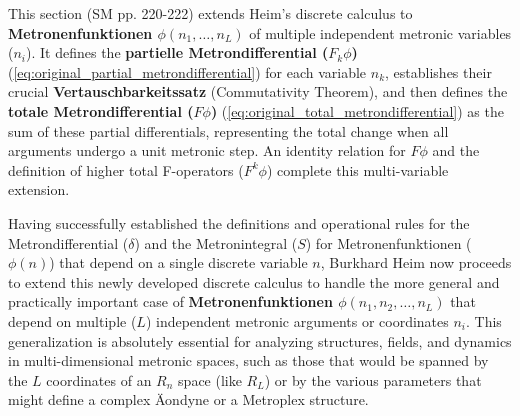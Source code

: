 \documentclass[12pt]{article}
\newcommand{\semantischermetrophor}{R_n}
\newcommand{\metrondifferential}{\delta}
\newcommand{\metronintegral}{S}
\newcommand{\metronenfunktion}{\phi(n)}
\newcommand{\metronenziffer}{n}
\begin{document}
This section (SM pp. 220-222) extends Heim's discrete calculus to \textbf{Metronenfunktionen \( \phi(n_1, \dots, n_L) \)} of multiple independent metronic variables (\(n_i\)). It defines the \textbf{partielle Metrondifferential (\(F_k\phi\))} (\eqref{eq:original_partial_metrondifferential}) for each variable \(n_k\), establishes their crucial \textbf{Vertauschbarkeitssatz} (Commutativity Theorem), and then defines the \textbf{totale Metrondifferential (\(F\phi\))} (\eqref{eq:original_total_metrondifferential}) as the sum of these partial differentials, representing the total change when all arguments undergo a unit metronic step. An identity relation for \(F\phi\) and the definition of higher total F-operators (\(F^k\phi\)) complete this multi-variable extension.

Having successfully established the definitions and operational rules for the Metrondifferential (\( \metrondifferential \)) and the Metronintegral (\( \metronintegral \)) for Metronenfunktionen (\( \metronenfunktion \)) that depend on a single discrete variable \( \metronenziffer \), Burkhard Heim now proceeds to extend this newly developed discrete calculus to handle the more general and practically important case of \textbf{Metronenfunktionen \( \phi(n_1, n_2, \dots, n_L) \)} that depend on multiple (\( L \)) independent metronic arguments or coordinates \( n_i \). This generalization is absolutely essential for analyzing structures, fields, and dynamics in multi-dimensional metronic spaces, such as those that would be spanned by the \( L \) coordinates of an \( \semantischermetrophor \) space (like \(R_L\)) or by the various parameters that might define a complex Äondyne or a Metroplex structure.
\end{document}
